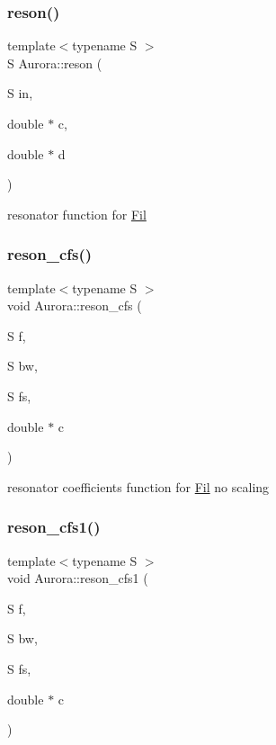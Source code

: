 \subsubsection{\texorpdfstring{reson()}{reson()}}
{\footnotesize\ttfamily template$<$typename S $>$ \\
S Aurora\+::reson (\begin{DoxyParamCaption}\item[{S}]{in,  }\item[{double $\ast$}]{c,  }\item[{double $\ast$}]{d }\end{DoxyParamCaption})\hspace{0.3cm}{\ttfamily [inline]}}

resonator function for \hyperlink{class_aurora_1_1_fil}{Fil} \mbox{\label{namespace_aurora_a6001679ef5f80dcee8eaa5d90b1f9448}} 
\subsubsection{\texorpdfstring{reson\+\_\+cfs()}{reson\_cfs()}}
{\footnotesize\ttfamily template$<$typename S $>$ \\
void Aurora\+::reson\+\_\+cfs (\begin{DoxyParamCaption}\item[{S}]{f,  }\item[{S}]{bw,  }\item[{S}]{fs,  }\item[{double $\ast$}]{c }\end{DoxyParamCaption})\hspace{0.3cm}{\ttfamily [inline]}}

resonator coefficients function for \hyperlink{class_aurora_1_1_fil}{Fil} no scaling \mbox{\label{namespace_aurora_a6a9aa81047a6c7c24bbd6d36077f6726}} 
\subsubsection{\texorpdfstring{reson\+\_\+cfs1()}{reson\_cfs1()}}
{\footnotesize\ttfamily template$<$typename S $>$ \\
void Aurora\+::reson\+\_\+cfs1 (\begin{DoxyParamCaption}\item[{S}]{f,  }\item[{S}]{bw,  }\item[{S}]{fs,  }\item[{double $\ast$}]{c }\end{DoxyParamCaption})\hspace{0.3cm}{\ttfamily [inline]}}

